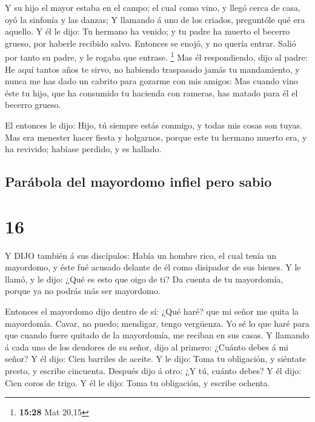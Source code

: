  Y su hijo el mayor estaba en el campo; el cual como vino,
y llegó cerca de casa, oyó la sinfonía y las danzas;  Y
llamando á uno de los criados, preguntóle qué era aquello. 
Y él le dijo: Tu hermano ha venido; y tu padre ha muerto el becerro
grueso, por haberle recibido salvo.  Entonces se enojó, y
no quería entrar. Salió por tanto su padre, y le rogaba que entrase.
\footnote{\textbf{15:28} Mat 20,15}  Mas él respondiendo,
dijo al padre: He aquí tantos años te sirvo, no habiendo traspasado
jamás tu mandamiento, y nunca me has dado un cabrito para gozarme con
mis amigos:  Mas cuando vino éste tu hijo, que ha consumido
tu hacienda con rameras, has matado para él el becerro grueso.

 El entonces le dijo: Hijo, tú siempre estás conmigo, y
todas mis cosas son tuyas.  Mas era menester hacer fiesta y
holgarnos, porque este tu hermano muerto era, y ha revivido; habíase
perdido, y es hallado.

\hypertarget{paruxe1bola-del-mayordomo-infiel-pero-sabio}{%
\subsection{Parábola del mayordomo infiel pero
sabio}\label{paruxe1bola-del-mayordomo-infiel-pero-sabio}}

\hypertarget{section-15}{%
\section{16}\label{section-15}}

 Y DIJO también á sus discípulos: Había un hombre rico, el
cual tenía un mayordomo, y éste fué acusado delante de él como disipador
de sus bienes.  Y le llamó, y le dijo: ¿Qué es esto que oigo
de ti? Da cuenta de tu mayordomía, porque ya no podrás más ser
mayordomo.

 Entonces el mayordomo dijo dentro de sí: ¿Qué haré? que mi
señor me quita la mayordomía. Cavar, no puedo; mendigar, tengo
vergüenza.  Yo sé lo que haré para que cuando fuere quitado
de la mayordomía, me reciban en sus casas.  Y llamando á
cada uno de los deudores de su señor, dijo al primero: ¿Cuánto debes á
mi señor?  Y él dijo: Cien barriles de aceite. Y le dijo:
Toma tu obligación, y siéntate presto, y escribe cincuenta. 
Después dijo á otro: ¿Y tú, cuánto debes? Y él dijo: Cien coros de
trigo. Y él le dijo: Toma tu obligación, y escribe ochenta.

